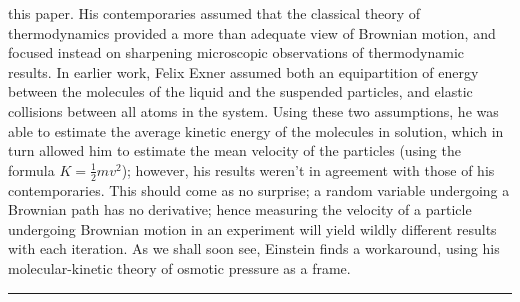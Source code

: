 \documentclass[12pt,reqno]{amsart}
\theoremstyle{plain}  %
\theoremstyle{definition}
\begin{document}
this paper. His contemporaries assumed that the classical theory of thermodynamics
provided a more than adequate view of Brownian motion, and focused instead on
sharpening microscopic observations of thermodynamic results. In earlier work, Felix
Exner assumed both an equipartition of energy between the molecules of the liquid
and the suspended particles, and elastic collisions
between all atoms in the system. Using these two
assumptions, he was able to estimate the average kinetic energy of the molecules in
solution, which in turn allowed him to estimate the mean velocity
of the particles (using the formula $K = \frac{1}{2}mv^2$); however, his results
weren't in agreement with those of his contemporaries. This
should come as no surprise; a random variable undergoing a Brownian path has no
derivative; hence measuring the velocity of a particle undergoing Brownian motion in an
experiment will yield wildly different results with each iteration. As we shall soon
see, Einstein finds a workaround, using his molecular-kinetic theory of osmotic
pressure as a frame.
\\
\hrule
\end{document}
